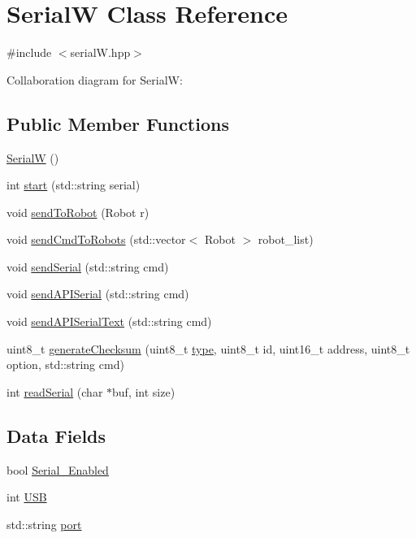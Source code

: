 \hypertarget{class_serial_w}{}\section{SerialW Class Reference}
\label{class_serial_w}


{\ttfamily \#include $<$serial\+W.\+hpp$>$}



Collaboration diagram for SerialW\+:
\subsection*{Public Member Functions}
\begin{DoxyCompactItemize}
\item 
\hyperlink{class_serial_w_acba41f819a6ac6e0372ef113a1843985}{SerialW} ()
\item 
int \hyperlink{class_serial_w_a39a09737475182fe3588d3b78cae4bf3}{start} (std\+::string serial)
\item 
void \hyperlink{class_serial_w_a05d1b44110f4f36bedace0ac729e09b6}{send\+To\+Robot} (Robot r)
\item 
void \hyperlink{class_serial_w_a59559f7883b8215d92a47aafc95d5cf4}{send\+Cmd\+To\+Robots} (std\+::vector$<$ Robot $>$ robot\+\_\+list)
\item 
void \hyperlink{class_serial_w_a67953d9f4d61a9caeb562d94821d9f03}{send\+Serial} (std\+::string cmd)
\item 
void \hyperlink{class_serial_w_a482e8608c6048b44b0772fecf8a922d9}{send\+A\+P\+I\+Serial} (std\+::string cmd)
\item 
void \hyperlink{class_serial_w_a612587d40ba4735e99cdf1af67d5a6a0}{send\+A\+P\+I\+Serial\+Text} (std\+::string cmd)
\item 
uint8\+\_\+t \hyperlink{class_serial_w_a757c428d5a375862430ddef74512a043}{generate\+Checksum} (uint8\+\_\+t \hyperlink{classstd_1_1conditional_1_1type}{type}, uint8\+\_\+t id, uint16\+\_\+t address, uint8\+\_\+t option, std\+::string cmd)
\item 
int \hyperlink{class_serial_w_a94d4f4ad3623e70c47f45ca5f16ba5e5}{read\+Serial} (char $\ast$buf, int size)
\end{DoxyCompactItemize}
\subsection*{Data Fields}
\begin{DoxyCompactItemize}
\item 
bool \hyperlink{class_serial_w_a557f72152ee772956c44fade26c1fd14}{Serial\+\_\+\+Enabled}
\item 
int \hyperlink{class_serial_w_addbc2cde514329294a30fd04da051ec8}{U\+SB}
\item 
std\+::string \hyperlink{class_serial_w_afc325a02adcff1960a5be974a908631e}{port}
\end{DoxyCompactItemize}


